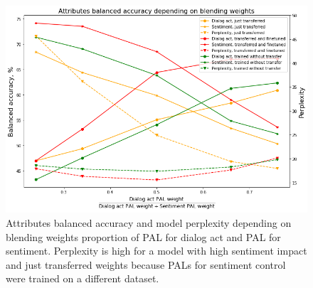 \documentclass[11pt]{article}
\begin{document}
\begin{figure}[ht]
    \centering
    \includegraphics[scale=0.5]{img/reweighting_pals.png}
    \caption{Attributes balanced accuracy and model perplexity depending on blending weights proportion of PAL for dialog act and PAL for sentiment. Perplexity is high for a model with high sentiment impact and just transferred weights because PALs for sentiment control were trained on a different dataset.}
    \label{reweighting_pals}
\end{figure}
\end{document}
